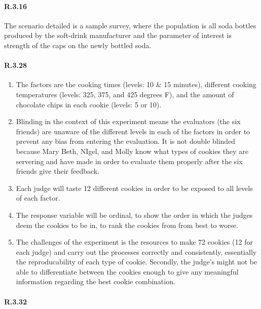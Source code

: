 \documentclass[]{article}
\let\oldparagraph\paragraph
\renewcommand{\paragraph}[1]{\oldparagraph{#1}\mbox{}}
\begin{document}
\hypertarget{r.3.16}{%
\paragraph{R.3.16}\label{r.3.16}}

The scenario detailed is a sample survey, where the population is all
soda bottles produced by the soft-drink manufacturer and the parameter
of interest is strength of the caps on the newly bottled soda.

\hypertarget{r.3.28}{%
\paragraph{R.3.28}\label{r.3.28}}

\begin{enumerate}
\def\labelenumi{\alph{enumi})}
\item
  The factors are the cooking times (levels: 10 \& 15 minutes),
  different cooking temperatures (levels: 325, 375, and 425 degrees F),
  and the amount of chocolate chips in each cookie (levels: 5 or 10).
\item
  Blinding in the context of this experiment means the evaluators (the
  six friends) are unaware of the different levels in each of the
  factors in order to prevent any bias from entering the evaluation. It
  is not double blinded because Mary Beth, NIgel, and Molly know what
  types of cookies they are servering and have made in order to evaluate
  them properly after the six friends give their feedback.
\item
  Each judge will taste 12 different cookies in order to be exposed to
  all levels of each factor.
\item
  The response variable will be ordinal, to show the order in which the
  judges deem the cookies to be in, to rank the cookies from from best
  to worse.
\item
  The challenges of the experiment is the resources to make 72 cookies
  (12 for each judge) and carry out the processes correctly and
  consistently, essentially the reproducability of each type of cookie.
  Secondly, the judge's might not be able to differentiate between the
  cookies enough to give any meaningful information regarding the best
  cookie combination.
\end{enumerate}

\hypertarget{r.3.32}{%
\paragraph{R.3.32}\label{r.3.32}}
\end{document}
